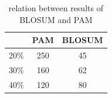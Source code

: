 \documentclass[11pt]{article}
\begin{document}
\begin{table}[h]
	\caption{relation between results of BLOSUM and PAM}
	\label{tab:relationPAMandBLOSUM}
	\centering

	\begin{tabular}{l|cc}
	\hline

	\hline
	& \textbf{PAM} & \textbf{BLOSUM}  \\
	\hline
		20\% & 250 & 45\\
		30\% & 160 & 62\\
		40\% & 120 & 80\\
	\hline

	\hline
	\end{tabular}
\end{table}
\end{document}
